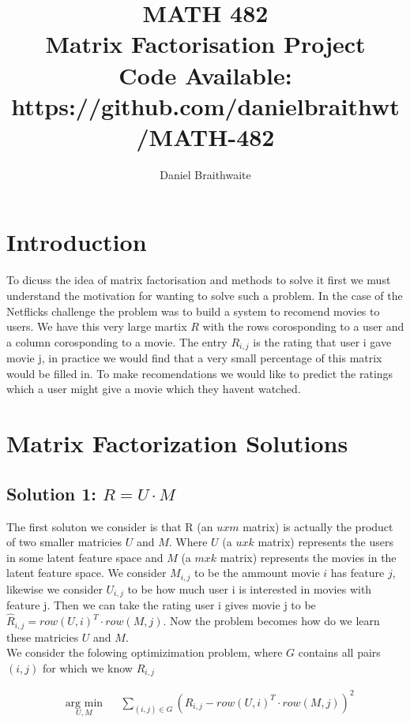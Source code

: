 \documentclass{article}
\title{%
	MATH 482\\
	\large Matrix Factorisation Project \\
	\small Code Available: https://github.com/danielbraithwt/MATH-482
}
\author{Daniel Braithwaite}
\begin{document}
\maketitle

\section{Introduction}
To dicuss the idea of matrix factorisation and methods to solve it first we must understand the motivation for wanting to solve such a problem. In the case of the Netflicks challenge the problem was to build a system to recomend movies to users. We have this very large martix $R$ with the rows corosponding to a user and a column corosponding to a movie. The entry $R_{i,j}$ is the rating that user i gave movie j, in practice we would find that a very small percentage of this matrix would be filled in. To make recomendations we would like to predict the ratings which a user might give a movie which they havent watched.\\

\section{Matrix Factorization Solutions}
\subsection{Solution 1: $R = U \cdot M$}
The first soluton we consider is that R (an $u x m$ matrix) is actually the product of two smaller matricies $U$ and $M$. Where $U$ (a $u x k$ matrix) represents the users in some latent feature space and $M$ (a $m x k$ matrix) represents the movies in the latent feature space. We consider $M_{i,j}$ to be the ammount movie $i$ has feature $j$, likewise we consider $U_{i,j}$ to be how much user i is interested in movies with feature j. Then we can take the rating user i gives movie j to be $\hat{R}_{i,j} = row(U, i)^T \cdot row(M, j)$. Now the problem becomes how do we learn these matricies $U$ and $M$.\\

We consider the folowing optimizimation problem, where $G$ contains all pairs $(i,j)$ for which we know $R_{i,j}$

\begin{equation*}
\begin{aligned}
& \underset{U, M}{\text{arg min}}
& & \sum_{(i,j) \in G} (R_{i,j} - row(U, i)^T \cdot row(M, j))^2  \\
\end{aligned}
\end{equation*}
\end{document}
